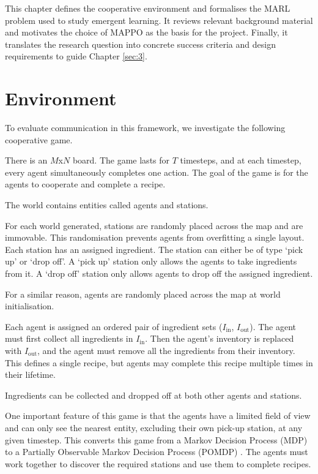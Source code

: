 \label{sec:2}

This chapter defines the cooperative environment and formalises the MARL problem used to study emergent learning.
It reviews relevant background material and motivates the choice of MAPPO as the basis for the project.
Finally, it translates the research question into concrete success criteria and design requirements to guide Chapter \ref{sec:3}.

\section{Environment}
\label{sec:2.1}

To evaluate communication in this framework, we investigate the following cooperative game.

There is an $M$x$N$ board.
The game lasts for $T$ timesteps, and at each timestep, every agent simultaneously completes one action.
The goal of the game is for the agents to cooperate and complete a recipe.

The world contains entities called agents and stations.

For each world generated, stations are randomly placed across the map and are immovable.
This randomisation prevents agents from overfitting a single layout.
Each station has an assigned ingredient. The station can either be of type `pick up' or `drop off'.
A `pick up' station only allows the agents to take ingredients from it.
A `drop off' station only allows agents to drop off the assigned ingredient.

For a similar reason, agents are randomly placed across the map at world initialisation.

Each agent is assigned an ordered pair of ingredient sets ($I_\text{in}$, $I_\text{out}$).
The agent must first collect all ingredients in $I_\text{in}$.
Then the agent's inventory is replaced with $I_\text{out}$, and the agent must remove all the ingredients from their inventory.
This defines a single recipe, but agents may complete this recipe multiple times in their lifetime.

Ingredients can be collected and dropped off at both other agents and stations.

One important feature of this game is that the agents have a limited field of view and can only see the nearest entity, excluding their own pick-up station, at any given timestep.
This converts this game from a Markov Decision Process (MDP) to a Partially Observable Markov Decision Process (POMDP) \cite{POMDP-COM}.
The agents must work together to discover the required stations and use them to complete recipes.

